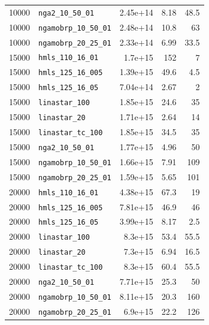 \begin{longtable}{|l|l|r|r|r|}
    10000 & \texttt{nga2\_10\_50\_01} & 2.45e+14 & 8.18 & 48.5 \\
    10000 & \texttt{ngamobrp\_10\_50\_01} & 2.48e+14 & 10.8 & 63 \\
    10000 & \texttt{ngamobrp\_20\_25\_01} & 2.33e+14 & 6.99 & 33.5 \\
    15000 & \texttt{hmls\_110\_16\_01} & 1.7e+15 & 152 & 7 \\
    15000 & \texttt{hmls\_125\_16\_005} & 1.39e+15 & 49.6 & 4.5 \\
    15000 & \texttt{hmls\_125\_16\_05} & 7.04e+14 & 2.67 & 2 \\
    15000 & \texttt{linastar\_100} & 1.85e+15 & 24.6 & 35 \\
    15000 & \texttt{linastar\_20} & 1.71e+15 & 2.64 & 14 \\
    15000 & \texttt{linastar\_tc\_100} & 1.85e+15 & 34.5 & 35 \\
    15000 & \texttt{nga2\_10\_50\_01} & 1.77e+15 & 4.96 & 50 \\
    15000 & \texttt{ngamobrp\_10\_50\_01} & 1.66e+15 & 7.91 & 109 \\
    15000 & \texttt{ngamobrp\_20\_25\_01} & 1.59e+15 & 5.65 & 101 \\
    20000 & \texttt{hmls\_110\_16\_01} & 4.38e+15 & 67.3 & 19 \\
    20000 & \texttt{hmls\_125\_16\_005} & 7.81e+15 & 46.9 & 46 \\
    20000 & \texttt{hmls\_125\_16\_05} & 3.99e+15 & 8.17 & 2.5 \\
    20000 & \texttt{linastar\_100} & 8.3e+15 & 53.4 & 55.5 \\
    20000 & \texttt{linastar\_20} & 7.3e+15 & 6.94 & 16.5 \\
    20000 & \texttt{linastar\_tc\_100} & 8.3e+15 & 60.4 & 55.5 \\
    20000 & \texttt{nga2\_10\_50\_01} & 7.71e+15 & 25.3 & 50 \\
    20000 & \texttt{ngamobrp\_10\_50\_01} & 8.11e+15 & 20.3 & 160 \\
    20000 & \texttt{ngamobrp\_20\_25\_01} & 6.9e+15 & 22.2 & 126 \\
\end{longtable}